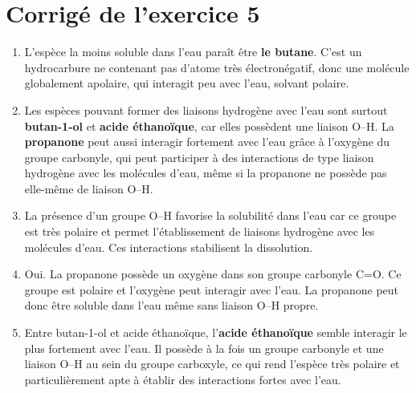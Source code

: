 \documentclass[11pt,a4paper]{article}
\begin{document}
\section*{Corrigé de l'exercice 5}
\begin{enumerate}[label=\textbf{\arabic*.},leftmargin=1.2em]
    \item L'espèce la moins soluble dans l'eau paraît être \textbf{le butane}. C'est un hydrocarbure ne contenant pas d'atome très électronégatif, donc une molécule globalement apolaire, qui interagit peu avec l'eau, solvant polaire.

    \item Les espèces pouvant former des liaisons hydrogène avec l'eau sont surtout \textbf{butan-1-ol} et \textbf{acide éthanoïque}, car elles possèdent une liaison O--H. La \textbf{propanone} peut aussi interagir fortement avec l'eau grâce à l'oxygène du groupe carbonyle, qui peut participer à des interactions de type liaison hydrogène avec les molécules d'eau, même si la propanone ne possède pas elle-même de liaison O--H.

    \item La présence d'un groupe O--H favorise la solubilité dans l'eau car ce groupe est très polaire et permet l'établissement de liaisons hydrogène avec les molécules d'eau. Ces interactions stabilisent la dissolution.

    \item Oui. La propanone possède un oxygène dans son groupe carbonyle C=O. Ce groupe est polaire et l'oxygène peut interagir avec l'eau. La propanone peut donc être soluble dans l'eau même sans liaison O--H propre.

    \item Entre butan-1-ol et acide éthanoïque, l'\textbf{acide éthanoïque} semble interagir le plus fortement avec l'eau. Il possède à la fois un groupe carbonyle et une liaison O--H au sein du groupe carboxyle, ce qui rend l'espèce très polaire et particulièrement apte à établir des interactions fortes avec l'eau.
\end{enumerate}
\end{document}
